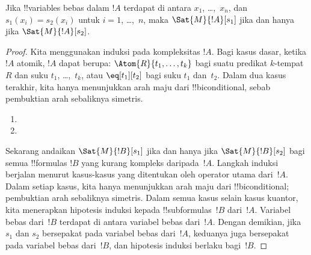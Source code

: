 \documentclass[../../../include/open-logic-section]{subfiles}
\begin{document}
\begin{prop}
Jika !!{variable}s bebas dalam $!A$ terdapat di antara $x_1$, \dots,~$x_n$,
dan $s_1(x_i) = s_2(x_i)$ untuk $i = 1$, \dots,~$n$, maka
$\Sat{M}{!A}[s_1]$ jika dan hanya jika $\Sat{M}{!A}[s_2]$.
\end{prop}

\begin{proof}
Kita menggunakan induksi pada kompleksitas $!A$. Bagi kasus dasar, ketika
$!A$ atomik, $!A$ dapat berupa:
$\Atom{R}{t_1, \dots, t_k}$ bagi suatu predikat $k$-tempat $R$ dan suku
$t_1$, \dots,~$t_k$, atau $\eq[t_1][t_2]$ bagi suku $t_1$ dan~$t_2$.
Dalam dua kasus terakhir, kita hanya menunjukkan arah maju dari
!!{biconditional}, sebab pembuktian arah sebaliknya simetris.

\begin{enumerate}


\item
\item
\end{enumerate}

Sekarang andaikan $\Sat{M}{!B}[s_1]$ jika dan hanya jika
$\Sat{M}{!B}[s_2]$ bagi semua !!{formula}s $!B$ yang kurang kompleks
daripada~$!A$. Langkah induksi berjalan menurut kasus-kasus yang ditentukan
oleh operator utama dari~$!A$. Dalam setiap kasus, kita hanya menunjukkan
arah maju dari !!{biconditional}; pembuktian arah sebaliknya simetris. Dalam
semua kasus selain kasus kuantor, kita menerapkan hipotesis induksi kepada
!!{subformula}s~$!B$ dari~$!A$. Variabel bebas dari~$!B$ terdapat di antara
variabel bebas dari~$!A$. Dengan demikian, jika $s_1$ dan $s_2$ bersepakat
pada variabel bebas dari~$!A$, keduanya juga bersepakat pada variabel bebas
dari~$!B$, dan hipotesis induksi berlaku bagi~$!B$.


\end{proof}
\end{document}
